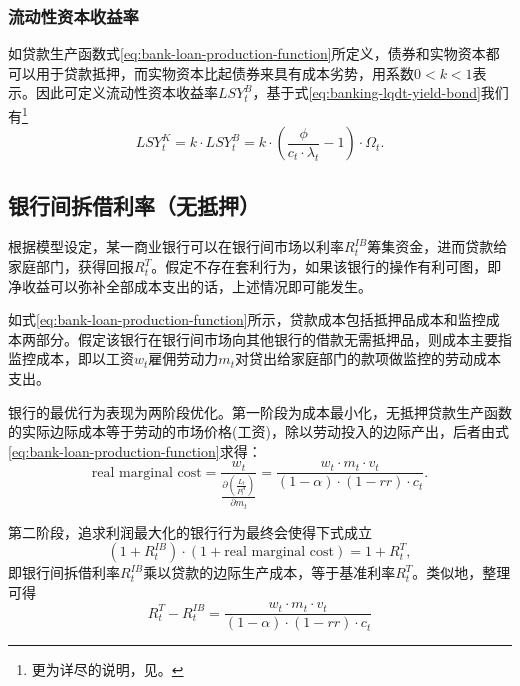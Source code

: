 \subsubsection{流动性资本收益率}

如贷款生产函数式\eqref{eq:bank-loan-production-function}所定义，债券和实物资本都可以用于贷款抵押，而实物资本比起债券来具有成本劣势，用系数$0<k<1$表示。因此可定义流动性资本收益率$LSY_t^B$，基于式\eqref{eq:banking-lqdt-yield-bond}我们有\footnote{更为详尽的说明，见\cite{Goodfriend:2005ts}。}
\begin{equation}
\label{eq:banking-lqdt-yield-capital}
LSY_t^K = k \cdot LSY_t^B = k \cdot \left(
\frac{\phi }{c_t \cdot \lambda_t} - 1
\right) \cdot \Omega_t.
\end{equation}

\subsection{银行间拆借利率（无抵押）}
根据模型设定，某一商业银行可以在银行间市场以利率$R_t^{IB}$筹集资金，进而贷款给家庭部门，获得回报$R_t^T$。假定不存在套利行为，如果该银行的操作有利可图，即净收益可以弥补全部成本支出的话，上述情况即可能发生。

如式\eqref{eq:bank-loan-production-function}所示，贷款成本包括抵押品成本和监控成本两部分。假定该银行在银行间市场向其他银行的借款无需抵押品，则成本主要指监控成本，即以工资$w_t$雇佣劳动力$m_t$对贷出给家庭部门的款项做监控的劳动成本支出。

银行的最优行为表现为两阶段优化。第一阶段为成本最小化，无抵押贷款生产函数的实际边际成本等于劳动的市场价格(工资)，除以劳动投入的边际产出，后者由式\eqref{eq:bank-loan-production-function}求得：
\begin{equation}
\label{eq:banking-real-marginal-cost}
\text{real marginal cost} = \frac{w_t}{\frac{\partial \left(\frac{L_t}{P_t^A}\right)}{\partial m_t}} = \frac{w_t \cdot m_t \cdot v_t}{(1-\alpha) \cdot (1-rr) \cdot c_t}.
\end{equation}

第二阶段，追求利润最大化的银行行为最终会使得下式成立
\begin{equation}
\label{eq:eq:banking-benchmark-interbank-rate}
\left(1+ R_t^{IB}\right) \cdot \left(
1+ \text{real marginal cost}
\right) = 1+R_t^T,
\end{equation}
即银行间拆借利率$R_t^{IB}$乘以贷款的边际生产成本，等于基准利率$R_t^T$。类似地，整理可得
\begin{equation}
\label{eq:banking-interbank-rate}
R_t^T - R_t^{IB} = \frac{w_t \cdot m_t \cdot v_t}{(1-\alpha) \cdot (1-rr) \cdot c_t}
\end{equation}


